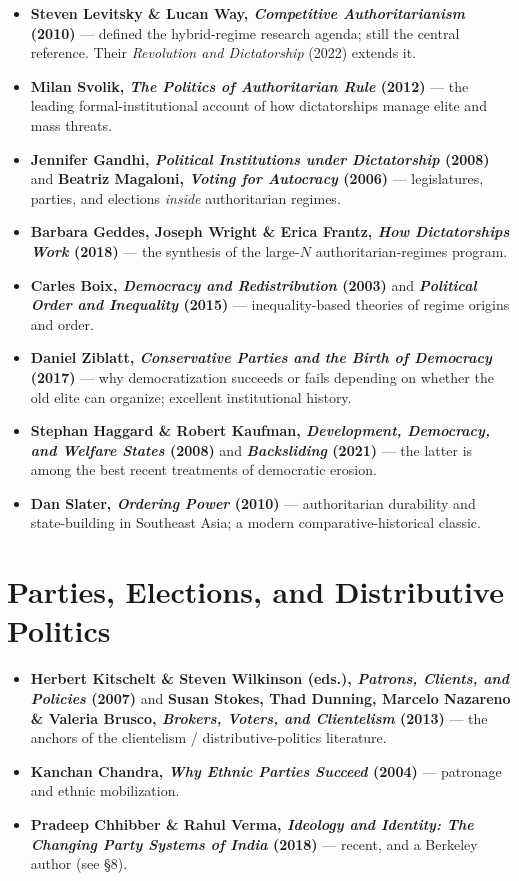 \documentclass[12pt]{article}
\begin{document}
\begin{itemize}[leftmargin=*, itemsep=4pt]
    \item \textbf{Steven Levitsky \& Lucan Way, \textit{Competitive Authoritarianism} (2010)} --- defined the hybrid-regime research agenda; still the central reference. Their \textit{Revolution and Dictatorship} (2022) extends it.
    \item \textbf{Milan Svolik, \textit{The Politics of Authoritarian Rule} (2012)} --- the leading formal-institutional account of how dictatorships manage elite and mass threats.
    \item \textbf{Jennifer Gandhi, \textit{Political Institutions under Dictatorship} (2008)} and \textbf{Beatriz Magaloni, \textit{Voting for Autocracy} (2006)} --- legislatures, parties, and elections \emph{inside} authoritarian regimes.
    \item \textbf{Barbara Geddes, Joseph Wright \& Erica Frantz, \textit{How Dictatorships Work} (2018)} --- the synthesis of the large-$N$ authoritarian-regimes program.
    \item \textbf{Carles Boix, \textit{Democracy and Redistribution} (2003)} and \textbf{\textit{Political Order and Inequality} (2015)} --- inequality-based theories of regime origins and order.
    \item \textbf{Daniel Ziblatt, \textit{Conservative Parties and the Birth of Democracy} (2017)} --- why democratization succeeds or fails depending on whether the old elite can organize; excellent institutional history.
    \item \textbf{Stephan Haggard \& Robert Kaufman, \textit{Development, Democracy, and Welfare States} (2008)} and \textbf{\textit{Backsliding} (2021)} --- the latter is among the best recent treatments of democratic erosion.
    \item \textbf{Dan Slater, \textit{Ordering Power} (2010)} --- authoritarian durability and state-building in Southeast Asia; a modern comparative-historical classic.
\end{itemize}

\section{Parties, Elections, and Distributive Politics}

\begin{itemize}[leftmargin=*, itemsep=4pt]
    \item \textbf{Herbert Kitschelt \& Steven Wilkinson (eds.), \textit{Patrons, Clients, and Policies} (2007)} and \textbf{Susan Stokes, Thad Dunning, Marcelo Nazareno \& Valeria Brusco, \textit{Brokers, Voters, and Clientelism} (2013)} --- the anchors of the clientelism / distributive-politics literature.
    \item \textbf{Kanchan Chandra, \textit{Why Ethnic Parties Succeed} (2004)} --- patronage and ethnic mobilization.
    \item \textbf{Pradeep Chhibber \& Rahul Verma, \textit{Ideology and Identity: The Changing Party Systems of India} (2018)} --- recent, and a Berkeley author (see \S8).
\end{itemize}
\end{document}
